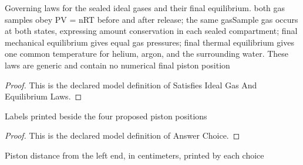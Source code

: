 \begin{definition}
  \label{def:physics:phyx-mini-0359:phyxminiproblems-problemphyxmini0359-satisfiesidealgasandequilibriumlaws}
  Governing laws for the sealed ideal gases and their final equilibrium. both gas samples obey PV = nRT before and after release; the same gasSample gas occurs at both states, expressing amount conservation in each sealed compartment; final mechanical equilibrium gives equal gas pressures; final thermal equilibrium gives one common temperature for helium, argon, and the surrounding water. These laws are generic and contain no numerical final piston position
\end{definition}
\begin{proof}
  This is the declared model definition of Satisfies Ideal Gas And Equilibrium Laws.
\end{proof}
\begin{definition}
  \label{def:physics:phyx-mini-0359:phyxminiproblems-problemphyxmini0359-answerchoice}
  Labels printed beside the four proposed piston positions
\end{definition}
\begin{proof}
  This is the declared model definition of Answer Choice.
\end{proof}
\begin{definition}
  \label{def:physics:phyx-mini-0359:phyxminiproblems-problemphyxmini0359-displayedpistonpositionincentimeters}
  Piston distance from the left end, in centimeters, printed by each choice
\end{definition}

